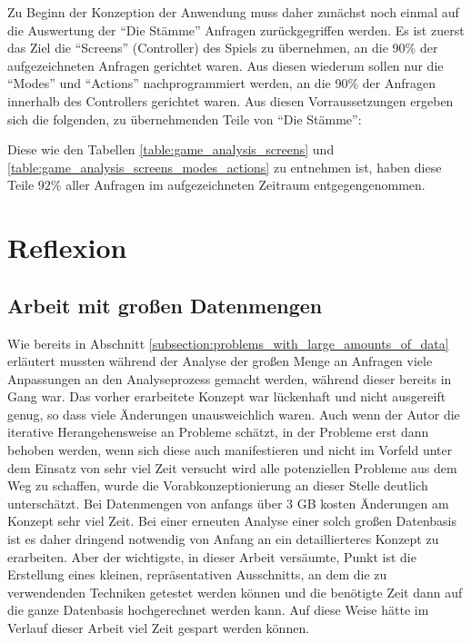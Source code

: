 \documentclass[10pt]{scrartcl}
\begin{document}
  Zu Beginn der Konzeption der Anwendung muss daher zunächst noch einmal auf die Auswertung der ``Die Stämme'' Anfragen zurückgegriffen werden. Es ist zuerst das Ziel die ``Screens'' (Controller) des Spiels zu übernehmen, an die 90\% der aufgezeichneten Anfragen gerichtet waren. Aus diesen wiederum sollen nur die ``Modes'' und ``Actions'' nachprogrammiert werden, an die 90\% der Anfragen innerhalb des Controllers gerichtet waren. Aus diesen Vorraussetzungen ergeben sich die folgenden, zu übernehmenden Teile von ``Die Stämme'':
  
  
  Diese wie den Tabellen \ref{table:game_analysis_screens} und \ref{table:game_analysis_screens_modes_actions} zu entnehmen ist, haben diese Teile $92\%$ aller Anfragen im aufgezeichneten Zeitraum entgegengenommen.
  
  
      
  \section{Reflexion}
  \subsection{Arbeit mit großen Datenmengen}
    Wie bereits in Abschnitt \ref{subsection:problems_with_large_amounts_of_data} erläutert mussten während der Analyse der großen Menge an Anfragen viele Anpassungen an den Analyseprozess gemacht werden, während dieser bereits in Gang war. Das vorher erarbeitete Konzept war lückenhaft und nicht ausgereift genug, so dass viele Änderungen unausweichlich waren. Auch wenn der Autor die iterative Herangehensweise an Probleme schätzt, in der Probleme erst dann behoben werden, wenn sich diese auch manifestieren und nicht im Vorfeld unter dem Einsatz von sehr viel Zeit versucht wird alle potenziellen Probleme aus dem Weg zu schaffen, wurde die Vorabkonzeptionierung an dieser Stelle deutlich unterschätzt. Bei Datenmengen von anfangs über 3 GB kosten Änderungen am Konzept sehr viel Zeit. Bei einer erneuten Analyse einer solch großen Datenbasis ist es daher dringend notwendig von Anfang an ein detaillierteres Konzept zu erarbeiten. Aber der wichtigste, in dieser Arbeit versäumte, Punkt ist die Erstellung eines kleinen, repräsentativen Ausschnitts, an dem die zu verwendenden Techniken getestet werden können und die benötigte Zeit dann auf die ganze Datenbasis hochgerechnet werden kann. Auf diese Weise hätte im Verlauf dieser Arbeit viel Zeit gespart werden können.
    
\end{document}
